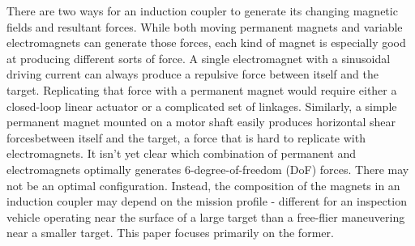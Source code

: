 There are two ways for an induction coupler to generate its changing magnetic fields and resultant forces. While both moving permanent magnets and variable electromagnets can generate those forces, each kind of magnet is especially good at producing different sorts of force. A single electromagnet with a sinusoidal driving current can always produce a repulsive force between itself and the target. Replicating that force with a permanent magnet would require either a closed-loop linear actuator or a complicated set of linkages. Similarly, a simple permanent magnet mounted on a motor shaft easily produces horizontal shear forcesbetween itself and the target, a force that is hard to replicate with electromagnets. It isn't yet clear which combination of permanent and electromagnets optimally generates 6-degree-of-freedom (DoF) forces. There may not be an optimal configuration. Instead, the composition of the magnets in an induction coupler may depend on the mission profile - different for an inspection vehicle operating near the surface of a large target than a free-flier maneuvering near a smaller target. This paper focuses primarily on the former.